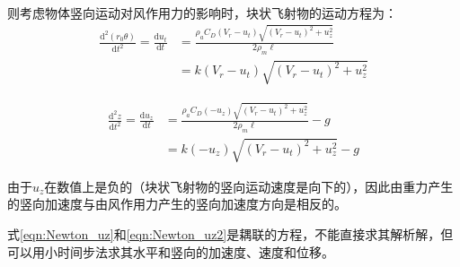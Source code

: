 \documentclass{ctexart}
\begin{document}
则考虑物体竖向运动对风作用力的影响时，块状飞射物的运动方程为\cite{Holmes2004}：
\begin{equation}
\label{eqn:Newton_uz}
\begin{split}
\frac{\mathrm{d}^2 (r_0 \theta)}{\mathrm{d} t^2} = \frac{\mathrm{d} u_t}{\mathrm{d} t}& = \frac{\rho_a C_D (V_r - u_t)\sqrt{\left(V_r-u_t\right)^2+u_z^2}}{2\rho_m \ell} \\
 & = k\left(V_r-u_t\right)\sqrt{\left(V_r-u_t\right)^2+u_z^2}
\end{split}
\end{equation}

\begin{equation}
\label{eqn:Newton_uz2}
\begin{split}
  \frac{\mathrm{d}^2 z}{\mathrm{d} t^2} = \frac{\mathrm{d}u_z}{\mathrm{d} t}&=  \frac{\rho_a C_D ( - u_z)\sqrt{\left(V_r-u_t\right)^2+u_z^2}}{2\rho_m \ell} -g \\
   & = k\left(-u_z\right)\sqrt{\left(V_r-u_t\right)^2+u_z^2}-g
\end{split}
\end{equation}

由于$u_z$在数值上是负的（块状飞射物的竖向运动速度是向下的），因此由重力产生的竖向加速度与由风作用力产生的竖向加速度方向是相反的。

式\eqref{eqn:Newton_uz}和\eqref{eqn:Newton_uz2}是耦联的方程，不能直接求其解析解，但可以用小时间步法\cite{Baker2004}求其水平和竖向的加速度、速度和位移。


\printbibliography
\end{document}
